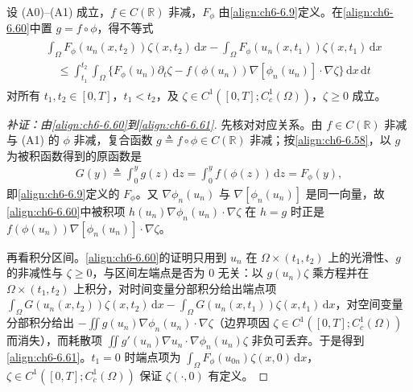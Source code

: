 \documentclass[../../main.tex]{subfiles}%
\begin{document}
\begin{remark}\label{remark:ch06-6.5.2}
设 (A0)--(A1) 成立，$f\in C(\mathbb{R})$ 非减，$F_\phi$ 由\eqref{align:ch6-6.9}定义。在\eqref{align:ch6-6.60}中置 $g=f\circ\phi$，得不等式
\begin{align}
\label{align:ch6-6.61}
\begin{aligned}
&\int_\Omega F_\phi(u_n(x,t_2))\zeta(x,t_2)\,\mathrm{d}x
-\int_\Omega F_\phi(u_n(x,t_1))\zeta(x,t_1)\,\mathrm{d}x\\
&\quad\leqslant\int_{t_1}^{t_2}\int_\Omega\{F_\phi(u_n)\partial_t\zeta
-f(\phi(u_n))\nabla[\phi_n(u_n)]\cdot\nabla\zeta\}\,\mathrm{d}x\,\mathrm{d}t
\end{aligned}
\end{align}
对所有 $t_1,t_2\in[0,T]$，$t_1<t_2$，及 $\zeta\in C^1([0,T];C^1_c(\Omega))$，$\zeta\geqslant0$ 成立。
\end{remark}

\begin{proof}[补证：由\eqref{align:ch6-6.60}到\eqref{align:ch6-6.61}]
先核对对应关系。由 $f\in C(\mathbb{R})$ 非减与 (A1) 的 $\phi$ 非减，复合函数 $g\triangleq f\circ\phi\in C(\mathbb{R})$ 非减；按\eqref{align:ch6-6.58}，以 $g$ 为被积函数得到的原函数是
\begin{align*}
G(y)\triangleq\int_0^yg(z)\,\mathrm{d}z=\int_0^yf(\phi(z))\,\mathrm{d}z=F_\phi(y),
\end{align*}
即\eqref{align:ch6-6.9}定义的 $F_\phi$。又 $\nabla\phi_n(u_n)$ 与 $\nabla[\phi_n(u_n)]$ 是同一向量，故\eqref{align:ch6-6.60}中被积项 $h(u_n)\nabla\phi_n(u_n)\cdot\nabla\zeta$ 在 $h=g$ 时正是 $f(\phi(u_n))\nabla[\phi_n(u_n)]\cdot\nabla\zeta$。

再看积分区间。\eqref{align:ch6-6.60}的证明只用到 $u_n$ 在 $\Omega\times(t_1,t_2)$ 上的光滑性、$g$ 的非减性与 $\zeta\geqslant0$，与区间左端点是否为 $0$ 无关：以 $g(u_n)\zeta$ 乘方程并在 $\Omega\times(t_1,t_2)$ 上积分，对时间变量分部积分给出端点项 $\int_\Omega G(u_n(x,t_2))\zeta(x,t_2)\,\mathrm{d}x-\int_\Omega G(u_n(x,t_1))\zeta(x,t_1)\,\mathrm{d}x$，对空间变量分部积分给出 $-\iint g(u_n)\nabla\phi_n(u_n)\cdot\nabla\zeta$（边界项因 $\zeta\in C^1([0,T];C^1_c(\Omega))$ 而消失），而耗散项 $\iint g'(u_n)\nabla u_n\cdot\nabla\phi_n(u_n)\zeta$ 非负可丢弃。于是得到\eqref{align:ch6-6.61}。$t_1=0$ 时端点项为 $\int_\Omega F_\phi(u_{0n})\zeta(x,0)\,\mathrm{d}x$，$\zeta\in C^1([0,T];C^1_c(\Omega))$ 保证 $\zeta(\cdot,0)$ 有定义。
\end{proof}
\end{document}
